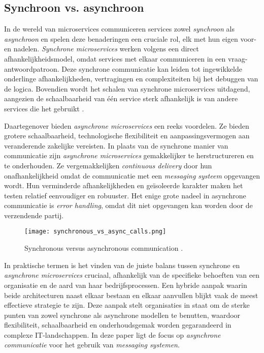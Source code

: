 \subsection{Synchroon vs. asynchroon}
In de wereld van microservices communiceren services zowel \emph{synchroon} als \emph{asynchroon} en spelen deze benaderingen een cruciale rol, 
elk met hun eigen voor- en nadelen. \emph{Synchrone microservices} werken volgens een direct 
afhankelijkheidsmodel, omdat services met elkaar communiceren in een vraag-antwoordpatroon. 
Deze synchrone communicatie kan leiden tot ingewikkelde onderlinge afhankelijkheden, vertragingen en complexiteiten bij het debuggen 
van de logica. Bovendien wordt het schalen van synchrone microservices uitdagend, 
aangezien de schaalbaarheid van één service sterk afhankelijk is van andere services die het gebruikt \autocite{Bellemare2020}. 
\newline

Daartegenover bieden \emph{asynchrone microservices} een reeks voordelen. Ze bieden grotere schaalbaarheid, technologische 
flexibiliteit en aanpassingsvermogen aan veranderende zakelijke vereisten. 
In plaats van de synchrone manier van communicatie zijn \emph{asynchrone microservices} 
gemakkelijker te herstructureren en te onderhouden. 
Ze vergemakkelijken \emph{continuous delivery} door hun onafhankelijkheid omdat de communicatie 
met een \emph{messaging systeem} opgevangen wordt. Hun verminderde afhankelijkheden en 
geïsoleerde karakter maken het testen relatief eenvoudiger en robuuster.
Het enige grote nadeel in asynchrone communicatie is \emph{error handling}, 
omdat dit niet opgevangen kan worden door de verzendende partij.
\newline

\begin{figure}[H]
  \centering
  \texttt{[image: synchronous\_vs\_async\_calls.png]}
  \caption{\label{fig:img}Synchronous versus asynchronous communication \autocite[figure 14 -- 13]{MarkRichards2021}.}
\end{figure}

In praktische termen is het vinden van de juiste balans tussen synchrone en \emph{asynchrone microservices} cruciaal, 
afhankelijk van de specifieke behoeften van een organisatie en de aard van haar bedrijfsprocessen. 
Een hybride aanpak waarin beide architecturen naast elkaar bestaan en elkaar aanvullen blijkt vaak de meest effectieve strategie te zijn. 
Deze aanpak stelt organisaties in staat om de sterke punten van zowel synchrone als asynchrone modellen te benutten, 
waardoor flexibiliteit, schaalbaarheid en onderhoudsgemak worden gegarandeerd in complexe \newline IT-landschappen.
In deze paper ligt de focus op \emph{asynchrone communicatie} voor het gebruik van \emph{messaging systemen}.
\newline

